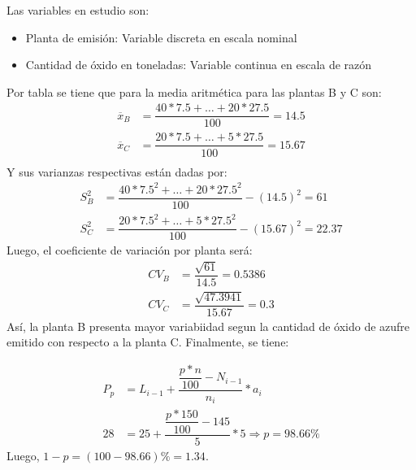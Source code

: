 \begin{solution}
    Las variables en estudio son:
    \begin{itemize}
        \item Planta de emisión: Variable discreta en escala nominal
        \item Cantidad de óxido en toneladas: Variable continua en escala de razón
    \end{itemize} 
Por tabla se tiene que para la media aritmética para las plantas B y C son:
\begin{align*}
    \overline{x}_B&=\dfrac{40*7.5+\dots+20*27.5}{100}=14.5\\
    \overline{x}_C&=\dfrac{20*7.5+\dots+5*27.5}{100}=15.67\\
\end{align*}
Y sus varianzas respectivas están dadas por:
\begin{align*}
    S_{B}^{2}&=\dfrac{40*7.5^2+\dots+20*27.5^2}{100}-(14.5)^2=61\\
    S_{C}^{2}&=\dfrac{20*7.5^2+\dots+5*27.5^2}{100}-(15.67)^2=22.37
\end{align*}
Luego, el coeficiente de variación por planta será:
\begin{align*}
    CV_B&=\dfrac{\sqrt{61}}{14.5}=0.5386\\
    CV_C&=\dfrac{\sqrt{47.3941}}{15.67}=0.3
\end{align*}
Así, la planta B presenta mayor variabiidad segun la cantidad de óxido de azufre emitido con respecto a la planta C. Finalmente, se tiene:

\begin{align*}
    P_p&=L_{i-1}+\dfrac{\dfrac{p*n}{100}-N_{i-1}}{n_i}*a_i\\
    28 &=25+\dfrac{\dfrac{p*150}{100}-145}{5}*5 \Rightarrow p=98.66\%
\end{align*}
Luego, $1-p=(100-98.66)\%=1.34$.
\end{solution}
